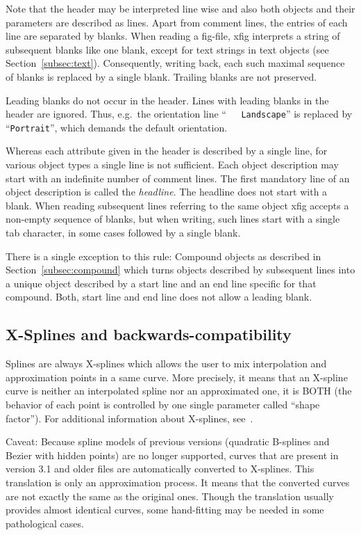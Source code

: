 \documentclass[10pt, a4paper]{article}
\begin{document}
Note that the header may be interpreted line wise 
and also both objects and their parameters are described as lines. 
Apart from comment lines, the entries of each line are separated by blanks. 
When reading a fig-file, 
xfig interprets a string of subsequent blanks like one blank, 
except for text strings in text objects (see Section~\ref{subsec:text}). 
Consequently, writing back, each such maximal sequence of blanks 
is replaced by a single blank. 
Trailing blanks are not preserved. 

Leading blanks do not occur in the header. 
Lines with leading blanks in the header are ignored. 
Thus, e.g.~the orientation line 
``\texttt{\ \ \ Landscape}'' is replaced by ``\texttt{Portrait}'', 
which demands the default orientation. 

Whereas each attribute given in the header is described by a single line, 
for various object types a single line is not sufficient. 
Each object description may start with an indefinite number of comment lines. 
The first mandatory line of an object description is called the \emph{headline}. 
The headline does not start with a blank. 
When reading subsequent lines referring to the same object 
xfig accepts a non-empty sequence of blanks, 
but when writing, such lines start with a single tab character, 
in some cases followed by a single blank. 

There is a single exception to this rule: 
Compound objects as described in Section~\ref{subsec:compound} 
which turns objects described by subsequent lines 
into a unique object described by a 
start line and an end line specific for that compound. 
Both, start line and end line does not allow a leading blank. 


\subsection{X-Splines and backwards-compatibility}

Splines are always X-splines 
which allows the user to mix interpolation and approximation 
points in a same curve. 
More precisely, it means that an X-spline curve 
is neither an interpolated spline nor an approximated one, 
it is BOTH (the behavior of each point 
is controlled by one single parameter called ``shape factor''). 
For additional information about X-splines, see~\cite{XSpline}. 

Caveat: Because spline models of previous versions 
(quadratic B-splines and Bezier with hidden points) 
are no longer supported, 
curves that are present in version 3.1 and older files 
are automatically converted to X-splines. 
This translation is only an approximation process. 
It means that the converted curves 
are not exactly the same as the original ones. 
Though the translation usually provides almost identical curves, 
some hand-fitting may be needed in some pathological cases. 
\end{document}
